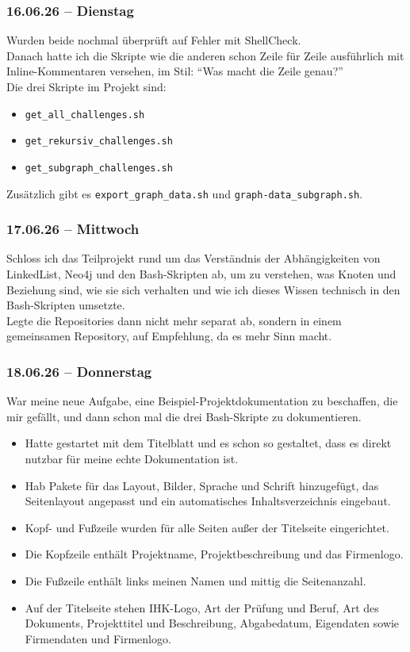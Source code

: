 \subsubsection{16.06.26 -- Dienstag}

Wurden beide nochmal überprüft auf Fehler mit ShellCheck.
\\
Danach hatte ich die Skripte wie die anderen schon Zeile für Zeile ausführlich mit Inline-Kommentaren versehen, im Stil: ``Was macht die Zeile genau?''
\\
Die drei Skripte im Projekt sind:
\begin{itemize}
    \item \texttt{get\_all\_challenges.sh}
    \item \texttt{get\_rekursiv\_challenges.sh}
    \item \texttt{get\_subgraph\_challenges.sh}
\end{itemize}

Zusätzlich gibt es \texttt{export\_graph\_data.sh} und \texttt{graph-data\_subgraph.sh}.

\subsubsection{17.06.26 -- Mittwoch}

Schloss ich das Teilprojekt rund um das Verständnis der Abhängigkeiten von LinkedList, Neo4j und den Bash-Skripten ab, um zu verstehen, was Knoten und Beziehung sind, wie sie sich verhalten und wie ich dieses Wissen technisch in den Bash-Skripten umsetzte.
\\
Legte die Repositories dann nicht mehr separat ab, sondern in einem gemeinsamen Repository, auf Empfehlung, da es mehr Sinn macht.

\subsubsection{18.06.26 -- Donnerstag}

War meine neue Aufgabe, eine Beispiel-Projektdokumentation zu beschaffen, die mir gefällt, und dann schon mal die drei Bash-Skripte zu dokumentieren.

\begin{itemize}[itemsep=2pt, topsep=4pt]
    \item Hatte gestartet mit dem Titelblatt und es schon so gestaltet, dass es direkt nutzbar für meine echte Dokumentation ist.
    \item Hab Pakete für das Layout, Bilder, Sprache und Schrift hinzugefügt, das Seitenlayout angepasst und ein automatisches Inhaltsverzeichnis eingebaut.
    \item Kopf- und Fußzeile wurden für alle Seiten außer der Titelseite eingerichtet.
    \item Die Kopfzeile enthält Projektname, Projektbeschreibung und das Firmenlogo.
    \item Die Fußzeile enthält links meinen Namen und mittig die Seitenanzahl.
    \item Auf der Titelseite stehen IHK-Logo, Art der Prüfung und Beruf, Art des Dokuments, Projekttitel und Beschreibung, Abgabedatum, Eigendaten sowie Firmendaten und Firmenlogo.
\end{itemize}

